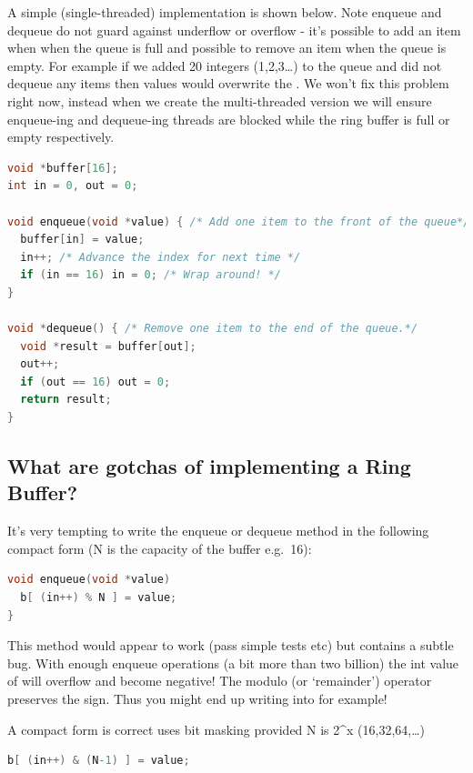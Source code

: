 A simple (single-threaded) implementation is shown below. Note enqueue and dequeue do not guard against underflow or overflow - it's possible to add an item when when the queue is full and possible to remove an item when the queue is empty. For example if we added 20 integers (1,2,3\ldots{}) to the queue and did not dequeue any items then values  would overwrite the . We won't fix this problem right now, instead when we create the multi-threaded version we will ensure enqueue-ing and dequeue-ing threads are blocked while the ring buffer is full or empty respectively.

\begin{lstlisting}[language=C]
void *buffer[16];
int in = 0, out = 0;

void enqueue(void *value) { /* Add one item to the front of the queue*/
  buffer[in] = value;
  in++; /* Advance the index for next time */
  if (in == 16) in = 0; /* Wrap around! */
}

void *dequeue() { /* Remove one item to the end of the queue.*/
  void *result = buffer[out];
  out++;
  if (out == 16) out = 0;
  return result;
}
\end{lstlisting}

\subsection{What are gotchas of implementing a Ring Buffer?}\label{what-are-gotchas-of-implementing-a-ring-buffer}

It's very tempting to write the enqueue or dequeue method in the following compact form (N is the capacity of the buffer e.g.~16):

\begin{lstlisting}[language=C]
void enqueue(void *value)
  b[ (in++) % N ] = value;
}
\end{lstlisting}

This method would appear to work (pass simple tests etc) but contains a subtle bug. With enough enqueue operations (a bit more than two billion) the int value of  will overflow and become negative! The modulo (or `remainder') operator \keyword{\%} preserves the sign. Thus you might end up writing into  for example!

A compact form is correct uses bit masking provided N is 2\^{}x (16,32,64,\ldots{})

\begin{lstlisting}[language=C]
b[ (in++) & (N-1) ] = value;
\end{lstlisting}

